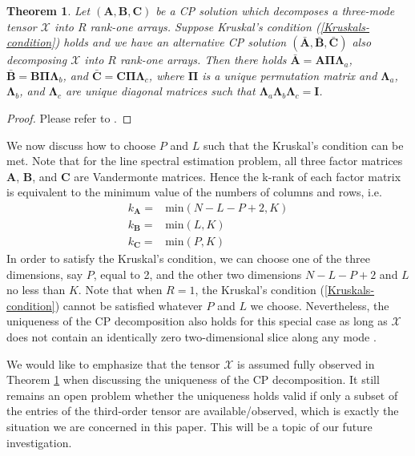 \documentclass[10pt,journal,epsfig]{IEEEtran}
\begin{document}
\newtheorem{theorem}{Theorem}
\begin{theorem} \label{theorem1}
Let $(\boldsymbol{A},\boldsymbol{B},\boldsymbol{C})$ be a CP
solution which decomposes a three-mode tensor
$\boldsymbol{\mathcal{X}}$ into $R$ rank-one arrays. Suppose
Kruskal's condition (\ref{Kruskals-condition}) holds and we have
an alternative CP solution
$(\boldsymbol{\bar{A}},\boldsymbol{\bar{B}},\boldsymbol{\bar{C}})$
also decomposing $\boldsymbol{\mathcal{X}}$ into $R$ rank-one
arrays. Then there holds
$\boldsymbol{\bar{A}}=\boldsymbol{A}\boldsymbol{\Pi}\boldsymbol{\Lambda}_a$,
$\boldsymbol{\bar{B}}=\boldsymbol{B}\boldsymbol{\Pi}\boldsymbol{\Lambda}_b$,
and
$\boldsymbol{\bar{C}}=\boldsymbol{C}\boldsymbol{\Pi}\boldsymbol{\Lambda}_c$,
where $\boldsymbol{\Pi}$ is a unique permutation matrix and
$\boldsymbol{\Lambda}_a$, $\boldsymbol{\Lambda}_b$, and
$\boldsymbol{\Lambda}_c$ are unique diagonal matrices such that
$\boldsymbol{\Lambda}_a\boldsymbol{\Lambda}_b\boldsymbol{\Lambda}_c=\boldsymbol{I}$.
\end{theorem}
\begin{proof}
Please refer to \cite{StegemanSidiropoulos07}.
\end{proof}

We now discuss how to choose $P$ and $L$ such that the Kruskal's
condition can be met. Note that for the line spectral estimation
problem, all three factor matrices $\boldsymbol{A}$,
$\boldsymbol{B}$, and $\boldsymbol{C}$ are Vandermonte matrices.
Hence the k-rank of each factor matrix is equivalent to the
minimum value of the numbers of columns and rows, i.e.
\begin{align}
k_{\boldsymbol{A}}=&\text{min}(N-L-P+2,K) \nonumber\\
k_{\boldsymbol{B}}=&\text{min}(L,K) \nonumber\\
k_{\boldsymbol{C}}=& \text{min}(P,K) \nonumber
\end{align}
In order to satisfy the Kruskal's condition, we can choose one of
the three dimensions, say $P$, equal to 2, and the other two
dimensions $N-L-P+2$ and $L$ no less than $K$. Note that when
$R=1$, the Kruskal's condition (\ref{Kruskals-condition}) cannot
be satisfied whatever $P$ and $L$ we choose. Nevertheless, the
uniqueness of the CP decomposition also holds for this special
case as long as $\boldsymbol{\mathcal{X}}$ does not contain an
identically zero two-dimensional slice along any mode
\cite{SidiropoulosGiannakis00}.


We would like to emphasize that the tensor
$\boldsymbol{\mathcal{X}}$ is assumed fully observed in Theorem
\ref{theorem1} when discussing the uniqueness of the CP
decomposition. It still remains an open problem whether the
uniqueness holds valid if only a subset of the entries of the
third-order tensor are available/observed, which is exactly the
situation we are concerned in this paper. This will be a topic of
our future investigation.
\end{document}
